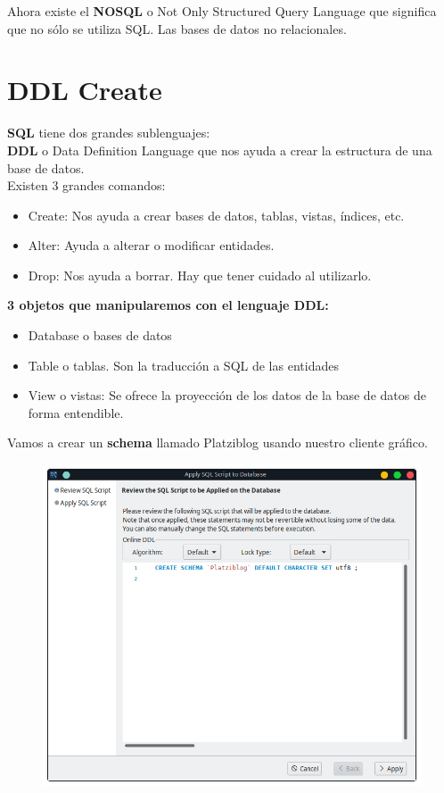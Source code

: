 \documentclass{article}
\begin{document}
Ahora existe el \textbf{NOSQL} o Not Only Structured Query Language que
significa que no sólo se utiliza SQL. Las bases de datos no relacionales.


\section{DDL Create}%
\textbf{SQL} tiene dos grandes sublenguajes:\\
\textbf{DDL} o Data Definition Language que nos ayuda a crear la estructura de
una base de datos.\\
Existen 3 grandes comandos:
\begin{itemize}
  \item Create: Nos ayuda a crear bases de datos, tablas, vistas, índices, etc.
  \item Alter: Ayuda a alterar o modificar entidades.
  \item Drop: Nos ayuda a borrar. Hay que tener cuidado al utilizarlo.
\end{itemize}

\textbf{3 objetos que manipularemos con el lenguaje DDL:}
\begin{itemize}
  \item Database o bases de datos
  \item Table o tablas. Son la traducción a SQL de las entidades
  \item View o vistas: Se ofrece la proyección de los datos de la base de datos
    de forma entendible.
\end{itemize}

Vamos a crear un \textbf{schema} llamado Platziblog usando nuestro cliente gráfico.\\
\begin{figure}[h!]
  \centering
  \includegraphics[scale=0.65]{./Pictures/040_create_schema.png}
\end{figure}
\end{document}
